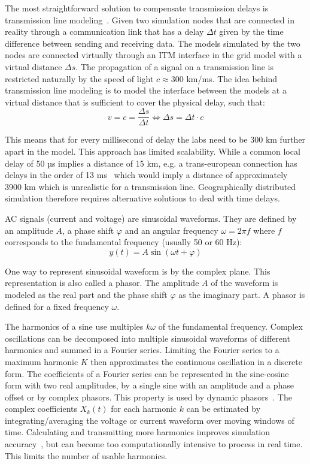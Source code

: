 \documentclass[a4paper]{atseminar}
\begin{document}
The most straightforward solution to compensate transmission delays is transmission line modeling~\cite{kuffel1995}. Given two simulation nodes that are connected in reality through a communication link that has a delay $\Delta t$ given by the time difference between sending and receiving data. The models simulated by the two nodes are connected virtually through an ITM interface in the grid model with a virtual distance $\Delta s$. The propagation of a signal on a transmission line is restricted naturally by the speed of light $c \approx 300$ km/ms. The idea behind transmission line modeling is to model the interface between the models at a virtual distance that is sufficient to cover the physical delay, such that:
\begin{equation}
    v = c = \frac{\Delta s}{\Delta t} \iff \Delta s = \Delta t \cdot c
\end{equation}

This means that for every millisecond of delay the labs need to be 300 km further apart in the model. This approach has limited scalability. While a common local delay of 50 µs implies a distance of 15 km, e.g. a trans-european connection has delays in the order of 13 ms~\cite{stevic2017europe} which would imply a distance of approximately 3900 km which is unrealistic for a transmission line. Geographically distributed simulation therefore requires alternative solutions to deal with time delays.

AC signals (current and voltage) are sinusoidal waveforms. They are defined by an amplitude $A$, a phase shift $\varphi$ and an angular frequency $\omega = 2\pi f$ where $f$ corresponds to the fundamental frequency (usually 50 or 60 Hz):
\begin{equation}
    y(t) = A \sin{(\omega t + \varphi)}
\end{equation}

One way to represent sinusoidal waveform is by the complex plane. This representation is also called a phasor. The amplitude $A$ of the waveform is modeled as the real part and the phase shift $\varphi$ as the imaginary part. A phasor is defined for a fixed frequency $\omega$.

The harmonics of a sine use multiples $k\omega$ of the fundamental frequency. Complex oscillations can be decomposed into multiple sinusoidal waveforms of different harmonics and summed in a Fourier series. Limiting the Fourier series to a maximum harmonic $K$ then approximates the continuous oscillation in a discrete form. The coefficients of a Fourier series can be represented in the sine-cosine form with two real amplitudes, by a single sine with an amplitude and a phase offset or by complex phasors. This property is used by dynamic phasors~\cite{stankovic2002, mirz2017phasor, stevic2017fidelity}. The complex coefficients $X_k(t)$ for each harmonic $k$ can be estimated by integrating/averaging the voltage or current waveform over moving windows of time. %
Calculating and transmitting more harmonics improves simulation accuracy~\cite{stevic2015sim, stevic2017europe}, but can become too computationally intensive to process in real time. This limits the number of usable harmonics.
\end{document}
